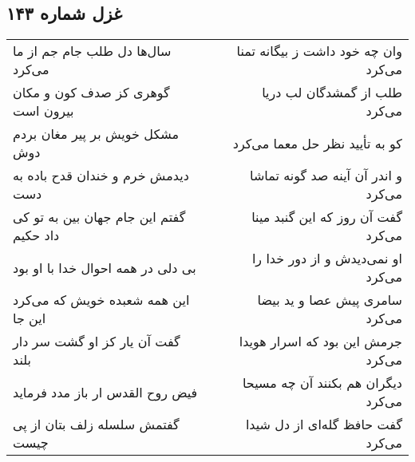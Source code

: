 \begin{center}
\section*{غزل شماره ۱۴۳}
\label{sec:sh143}
\begin{longtable}{l p{0.5cm} r}
سال‌ها دل طلب جام جم از ما می‌کرد
&&
وان چه خود داشت ز بیگانه تمنا می‌کرد
\\
گوهری کز صدف کون و مکان بیرون است
&&
طلب از گمشدگان لب دریا می‌کرد
\\
مشکل خویش بر پیر مغان بردم دوش
&&
کو به تأیید نظر حل معما می‌کرد
\\
دیدمش خرم و خندان قدح باده به دست
&&
و اندر آن آینه صد گونه تماشا می‌کرد
\\
گفتم این جام جهان بین به تو کی داد حکیم
&&
گفت آن روز که این گنبد مینا می‌کرد
\\
بی دلی در همه احوال خدا با او بود
&&
او نمی‌دیدش و از دور خدا را می‌کرد
\\
این همه شعبده خویش که می‌کرد این جا
&&
سامری پیش عصا و ید بیضا می‌کرد
\\
گفت آن یار کز او گشت سر دار بلند
&&
جرمش این بود که اسرار هویدا می‌کرد
\\
فیض روح القدس ار باز مدد فرماید
&&
دیگران هم بکنند آن چه مسیحا می‌کرد
\\
گفتمش سلسله زلف بتان از پی چیست
&&
گفت حافظ گله‌ای از دل شیدا می‌کرد
\\
\end{longtable}
\end{center}

